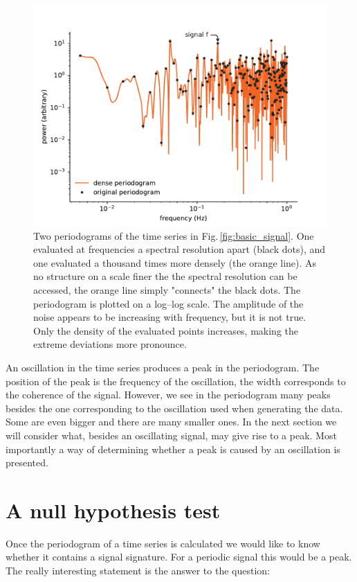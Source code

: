 \begin{figure}
  \centering \includegraphics[width=0.8\linewidth]{gfx/axions/basic_periodogram_loglog.pdf}
  \caption{Two periodograms of the time series in Fig.\,\ref{fig:basic_signal}. One evaluated at frequencies a spectral resolution apart (black dots), and one evaluated a thousand times more densely (the orange line). As no structure on a scale finer the the spectral resolution can be accessed, the orange line simply "connects" the black dots. The periodogram is plotted on a log--log scale. The amplitude of the noise appears to be increasing with frequency, but it is not true. Only the density of the evaluated points increases, making the extreme deviations more pronounce.}
  \label{fig:basic_periodogram_loglog}
\end{figure}

An oscillation in the time series produces a peak in the periodogram. The position of the peak is the frequency of the oscillation, the width corresponds to the coherence of the signal. However, we see in the periodogram many peaks besides the one corresponding to the oscillation used when generating the data. Some are even bigger and there are many smaller ones. In the next section we will consider what, besides an oscillating signal, may give rise to a peak. Most importantly a way of determining whether a peak is caused by an oscillation is presented.




\section{A null hypothesis test}
Once the periodogram of a time series is calculated we would like to know whether it contains a signal signature. For a periodic signal this would be a peak. The really interesting statement is the answer to the question:

